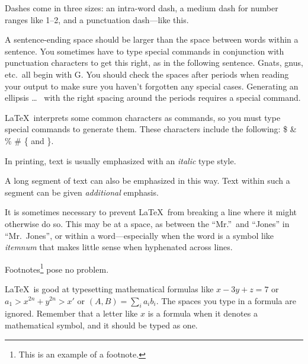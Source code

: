 \documentclass{article} %
\newcommand{\ip}[2]{(#1, #2)}
\begin{document}
Dashes come in three sizes: an
       intra-word
dash, a medium dash for number ranges like
       1--2,
and a punctuation
       dash---like
this.

A sentence-ending space should be larger than the
space between words within a sentence. You
sometimes have to type special commands in
conjunction with punctuation characters to get
this right, as in the following sentence.
       Gnats, gnus, etc.\ all %
       begin with G\@. %
You should check the spaces after periods when
reading your output to make sure you haven't
forgotten any special cases. Generating an
ellipsis
       \ldots\ %
with the right spacing around the periods requires
a special command.

\LaTeX\ interprets some common characters as
commands, so you must type special commands to
generate them. These characters include the
following:
       \$ \& \% \# \{ and \}.

In printing, text is usually emphasized with an
       \emph{italic}
type style.

\begin{em}
   A long segment of text can also be emphasized
   in this way. Text within such a segment can be
   given \emph{additional} emphasis.
\end{em}

It is sometimes necessary to prevent \LaTeX\ from
breaking a line where it might otherwise do so.
This may be at a space, as between the ``Mr.''\ and
``Jones'' in
       ``Mr.~Jones'', %
or within a word---especially when the word is a
symbol like
       \mbox{\emph{itemnum}}
that makes little sense when hyphenated across
lines.

Footnotes\footnote{This is an example of a footnote.}
pose no problem.

\LaTeX\ is good at typesetting mathematical formulas
like
       \( x-3y + z = 7 \)
or
       \( a_{1} > x^{2n} + y^{2n} > x' \)
or
       \( \ip{A}{B} = \sum_{i} a_{i} b_{i} \).
The spaces you type in a formula are
ignored. Remember that a letter like
       $x$ %
is a formula when it denotes a mathematical
symbol, and it should be typed as one.
\end{document}
